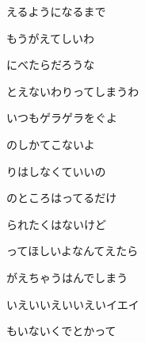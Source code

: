 \documentclass[a4paper,tate,twocolumn,12pt]{ltjtarticle}
\begin{document}
\begin{flushleft}
\begin{minipage}{\linewidth}
えるようになるまで
\end{minipage}

\vspace{2em}

\noindent\begin{minipage}{\linewidth}
もうがえてしいわ

にべたらだろうな

とえないわりってしまうわ

いつもゲラゲラをぐよ

のしかてこないよ

りはしなくていいの

のところはってるだけ
\end{minipage}

\vspace{2em}

\noindent\begin{minipage}{\linewidth}
られたくはないけど

ってほしいよなんてえたら

がえちゃうはんでしまう

いえいいえいいえいイエイ

もいないくでとかって

\end{minipage}

\end{flushleft}
\end{document}
